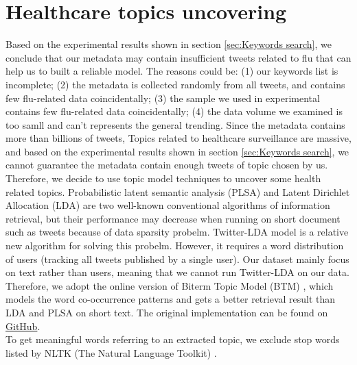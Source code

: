 \section{Healthcare topics uncovering}
\label{sec:uncoverig}
Based on the experimental results shown in section \ref{sec:Keywords search}, we conclude that our metadata may contain insufficient tweets related to flu that can help us to built a reliable model. The reasons could be: (1) our keywords list is incomplete; (2) the metadata is collected randomly from all tweets, and contains few flu-related data coincidentally; (3) the sample we used in experimental contains few flu-related data coincidentally; (4) the data volume we examined is too samll and can't represents the general trending. 
Since the metadata contains more than billions of tweets, 
Topics related to healthcare surveillance are massive, and based on the experimental results shown in section \ref{sec:Keywords search}, we cannot guarantee the metadata contain enough tweets of topic chosen by us. Therefore, we decide to use topic model techniques to uncover some health related topics. 
Probabilistic latent semantic analysis (PLSA) \cite{hofmann1999probabilistic} and Latent Dirichlet Allocation (LDA) \cite{blei2003latent} are two well-known conventional algorithms of information retrieval, but their performance may decrease when running on short document such as tweets because of data sparsity probelm. Twitter-LDA model \cite{zhao2011comparing} is a relative new algorithm for solving this probelm. However, it requires a word distribution of users (tracking all tweets published by a single user). Our dataset mainly focus on text rather than users, meaning that we cannot run Twitter-LDA on our data. Therefore, we adopt the online version of Biterm Topic Model (BTM) \cite{yan2013biterm, cheng2014btm}, which models the word co-occurrence patterns and gets a better retrieval result than LDA and PLSA on short text. The original implementation can be found on \href{https://github.com/xiaohuiyan/OnlineBTM}{GitHub}. \\

To get meaningful words referring to an extracted topic, we exclude stop words listed by NLTK (The Natural Language Toolkit) \cite{journals/corr/cs-CL-0205028}.